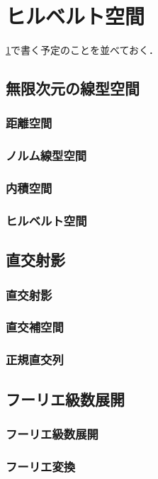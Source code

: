 \documentclass[../../main]{subfiles}
\begin{document}
\chapter{ヒルベルト空間}
\label{chapter:hilbert_space}
\begin{lead}
\cref{chapter:hilbert_space}で書く予定のことを並べておく．
\end{lead}

\section{無限次元の線型空間}
\subsection{距離空間}
\subsection{ノルム線型空間}
\subsection{内積空間}
\subsection{ヒルベルト空間}

\section{直交射影}
\subsection{直交射影}
\subsection{直交補空間}
\subsection{正規直交列}

\section{フーリエ級数展開}
\subsection{フーリエ級数展開}
\subsection{フーリエ変換}
\end{document}
